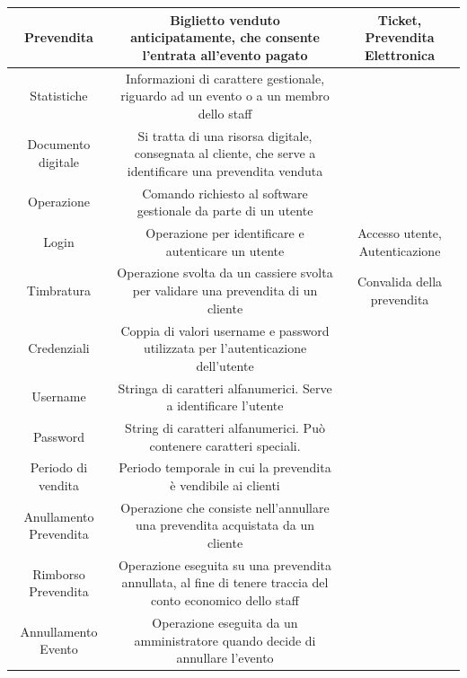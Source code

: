 \documentclass[a4paper]{article}
\begin{document}
\begin{table}[ht!]
\begin{center}
\begin{tabulary}{1\textwidth}{|c|C|C|}
        \hline
        Prevendita & Biglietto venduto anticipatamente, che consente l'entrata all'evento pagato & Ticket, Prevendita Elettronica \\
        \hline
		Statistiche & Informazioni di carattere gestionale, riguardo ad un evento o a un membro dello staff & \\
		\hline
		Documento digitale & Si tratta di una risorsa digitale, consegnata al cliente, che serve a identificare una prevendita venduta & \\
		\hline
		Operazione & Comando richiesto al software gestionale da parte di un utente & \\
		\hline
		Login & Operazione per identificare e autenticare un utente & Accesso utente, Autenticazione \\
		\hline
		Timbratura & Operazione svolta da un cassiere svolta per validare una prevendita di un cliente & Convalida della prevendita \\
		\hline
		Credenziali & Coppia di valori username e password utilizzata per l'autenticazione dell'utente & \\
		\hline
		Username & Stringa di caratteri alfanumerici. Serve a identificare l'utente & \\
		\hline
		Password & String di caratteri alfanumerici. Può contenere caratteri speciali. & \\
		\hline
		Periodo di vendita & Periodo temporale in cui la prevendita è vendibile ai clienti & \\
		\hline
		Anullamento Prevendita & Operazione che consiste nell'annullare una prevendita acquistata da un cliente & \\
		\hline
		Rimborso Prevendita & Operazione eseguita su una prevendita annullata, al fine di tenere traccia del conto economico dello staff & \\
		\hline
		Annullamento Evento & Operazione eseguita da un amministratore quando decide di annullare l'evento & \\
		\hline
    \end{tabulary}
  \end{center}
\end{table}

\newpage
\end{document}

